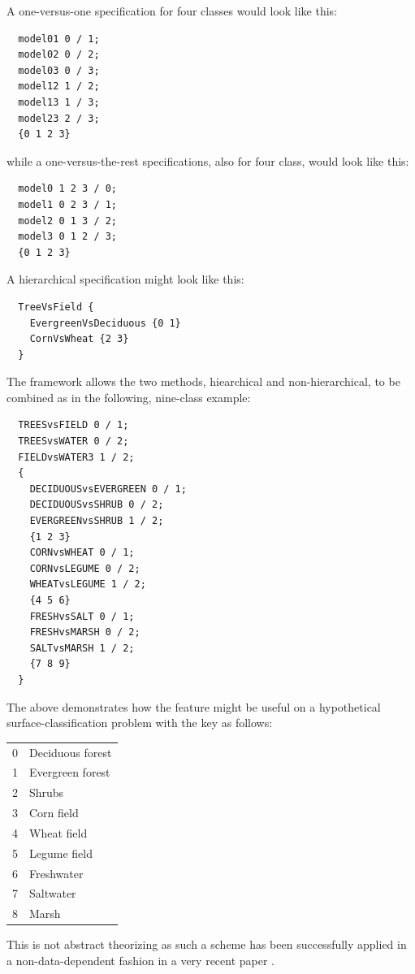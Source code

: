 A one-versus-one specification for four classes would look like
this:

\begin{verbatim}
  model01 0 / 1;
  model02 0 / 2;
  model03 0 / 3;
  model12 1 / 2;
  model13 1 / 3;
  model23 2 / 3;
  {0 1 2 3}
\end{verbatim}

while a one-versus-the-rest specifications, also for four class, would look
like this:

\begin{verbatim}
  model0 1 2 3 / 0;
  model1 0 2 3 / 1;
  model2 0 1 3 / 2;
  model3 0 1 2 / 3;
  {0 1 2 3}
\end{verbatim}

A hierarchical specification might look like this:

\begin{verbatim}
  TreeVsField {
    EvergreenVsDeciduous {0 1}
    CornVsWheat {2 3}
  }
\end{verbatim}

The framework allows the two methods,
 hiearchical and non-hierarchical, 
to be combined
as in the following, nine-class example:

\begin{verbatim}
  TREESvsFIELD 0 / 1;
  TREESvsWATER 0 / 2;
  FIELDvsWATER3 1 / 2;
  {
    DECIDUOUSvsEVERGREEN 0 / 1;
    DECIDUOUSvsSHRUB 0 / 2;
    EVERGREENvsSHRUB 1 / 2;
    {1 2 3}
    CORNvsWHEAT 0 / 1;
    CORNvsLEGUME 0 / 2;
    WHEATvsLEGUME 1 / 2;
    {4 5 6}
    FRESHvsSALT 0 / 1;
    FRESHvsMARSH 0 / 2;
    SALTvsMARSH 1 / 2;
    {7 8 9}
  }
\end{verbatim}

The above demonstrates how the feature might be useful
on a hypothetical surface-classification problem with the key as follows:

\begin{tabular}{ll}
	0 & Deciduous forest \\
	1 & Evergreen forest \\
	2 & Shrubs \\
	3 & Corn field \\
	4 & Wheat field \\
	5 & Legume field \\
	6 & Freshwater \\
	7 & Saltwater \\
	8 & Marsh
\end{tabular}

This is not abstract theorizing as
such a scheme has been successfully applied in a non-data-dependent fashion
in a very recent paper \citep{Zhou_etal2019}.

